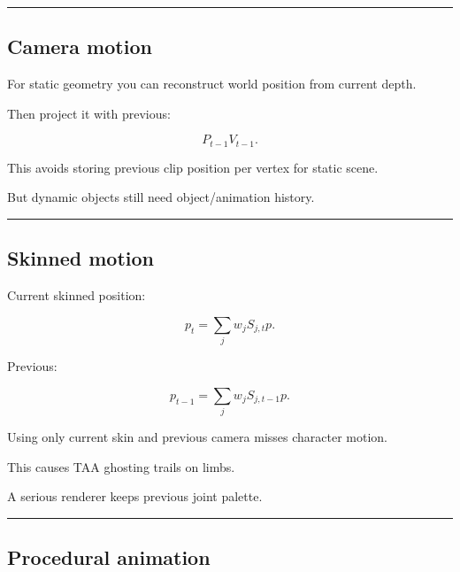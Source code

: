 \begin{center}\rule{0.5\linewidth}{0.5pt}\end{center}

\subsection{Camera motion}\label{04-visual-computing-ii-ch040-camera-motion}

\hypertarget{04-visual-computing-ii-ch040-camera-motion}{}

For static geometry you can reconstruct world position from current depth.

Then project it with previous:

\[
P_{t-1}V_{t-1}.
\]

This avoids storing previous clip position per vertex for static scene.

But dynamic objects still need object/animation history.

\begin{center}\rule{0.5\linewidth}{0.5pt}\end{center}

\subsection{Skinned motion}\label{04-visual-computing-ii-ch040-skinned-motion}

\hypertarget{04-visual-computing-ii-ch040-skinned-motion}{}

Current skinned position:

\[
p_t=
\sum_j
w_j
S_{j,t}p.
\]

Previous:

\[
p_{t-1}
=
\sum_j
w_j
S_{j,t-1}p.
\]

Using only current skin and previous camera misses character motion.

This causes TAA ghosting trails on limbs.

A serious renderer keeps previous joint palette.

\begin{center}\rule{0.5\linewidth}{0.5pt}\end{center}

\subsection{Procedural animation}\label{04-visual-computing-ii-ch040-procedural-animation}

\hypertarget{04-visual-computing-ii-ch040-procedural-animation}{}


